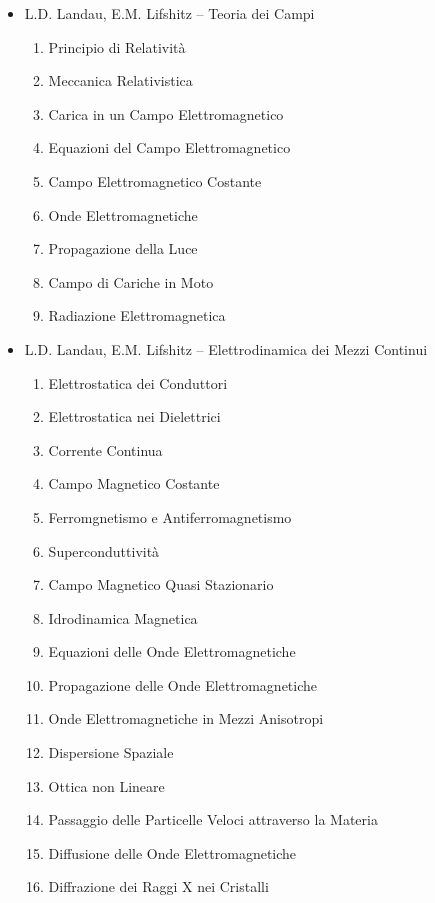 \begin{itemize}
\item L.D. Landau, E.M. Lifshitz -- Teoria dei Campi
\begin{enumerate}
\setcounter{enumi}{0}
\item Principio di Relatività
\item Meccanica Relativistica
\item Carica in un Campo Elettromagnetico
\item Equazioni del Campo Elettromagnetico
\item Campo Elettromagnetico Costante
\item Onde Elettromagnetiche
\item Propagazione della Luce
\item Campo di Cariche in Moto
\item Radiazione Elettromagnetica
\end{enumerate}

\item L.D. Landau, E.M. Lifshitz -- Elettrodinamica dei Mezzi Continui
\begin{enumerate}
\setcounter{enumi}{0}
\item Elettrostatica dei Conduttori
\item Elettrostatica nei Dielettrici
\item Corrente Continua
\item Campo Magnetico Costante
\item Ferromgnetismo e Antiferromagnetismo
\item Superconduttività
\item Campo Magnetico Quasi Stazionario
\item Idrodinamica Magnetica
\item Equazioni delle Onde Elettromagnetiche
\item Propagazione delle Onde Elettromagnetiche
\item Onde Elettromagnetiche in Mezzi Anisotropi
\item Dispersione Spaziale
\item Ottica non Lineare
\item Passaggio delle Particelle Veloci attraverso la Materia
\item Diffusione delle Onde Elettromagnetiche
\item Diffrazione dei Raggi X nei Cristalli
\end{enumerate}

\end{itemize}
